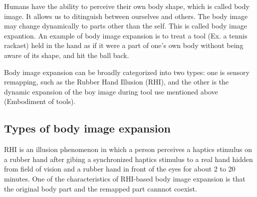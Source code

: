 \documentclass[letterpaper, 10 pt, conference]{ieeeconf}  %
\begin{document}
                Humans have the ability to perceive their own body shape, which is called body image\cite{head1911sensory}.  
                It allows us to ditinguish between ourselves and others.
                The body image may change dynamically to parts other than the self.  
                This is called body image expantion.  
                An example of body image expansion is to treat a tool (Ex. a tennis rackaet) held in the hand as if it were a part of one's own body without being aware of its shape, and hit the ball back\cite{botvinick1998rubber}.
                
                Body image expansion can be broadly categorized into two types: one is sensory remapping, such as the Rubber Hand Illusion (RHI), and the other is the dynamic expansion of the boy image during tool use mentioned above (Embodiment of tools).  

        \subsection{Types of body image expansion}
                RHI is an illusion phenomenon in which a person perceives a haptics stimulus on a rubber hand after gibing a synchronized haptics stimulus to a real hand hidden from field of vision and a rubber hand in front of the eyes for about 2 to 20 minutes.  
                One of the characteristics of RHI-based body image expansion is that the original body part and the remapped part cannnot coexist.
                
\end{document}
